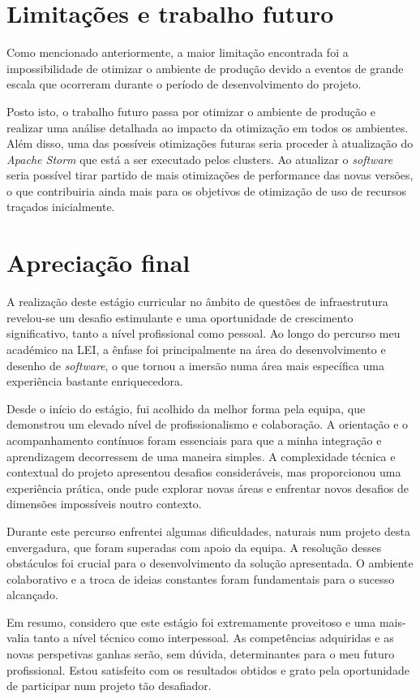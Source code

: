 \section{Limitações e trabalho futuro}

Como mencionado anteriormente, a maior limitação encontrada foi a impossibilidade de otimizar o
ambiente de produção devido a eventos de grande escala que ocorreram durante o período de
desenvolvimento do projeto. 

Posto isto, o trabalho futuro passa por otimizar o ambiente de produção e realizar uma análise 
detalhada ao impacto da otimização em todos os ambientes. Além disso, uma das possíveis otimizações 
futuras seria proceder à atualização do \textit{Apache Storm} que está a ser executado pelos 
\glspl{cluster}. Ao atualizar o \textit{software} seria possível tirar partido de mais otimizações 
de performance das novas versões, o que contribuiria ainda mais para os objetivos de otimização
de uso de recursos traçados inicialmente.

\section{Apreciação final}

A realização deste estágio curricular no âmbito de questões de infraestrutura revelou-se um desafio 
estimulante e uma oportunidade de crescimento significativo, tanto a nível profissional como 
pessoal. Ao longo do percurso meu académico na \ac{LEI}, a ênfase foi principalmente na área do 
desenvolvimento e desenho de \textit{software}, o que tornou a imersão numa área mais específica 
uma experiência bastante enriquecedora.

Desde o início do estágio, fui acolhido da melhor forma pela equipa, que demonstrou um elevado 
nível de profissionalismo e colaboração. A orientação e o acompanhamento contínuos foram essenciais
para que a minha integração e aprendizagem decorressem de uma maneira simples. A complexidade
técnica e contextual do projeto apresentou desafios consideráveis, mas proporcionou uma 
experiência prática, onde pude explorar novas áreas e enfrentar novos desafios de dimensões 
impossíveis noutro contexto.

Durante este percurso enfrentei algumas dificuldades, naturais num projeto desta envergadura, que 
foram superadas com apoio da equipa. A resolução desses obstáculos foi crucial para o desenvolvimento
da solução apresentada. O ambiente colaborativo e a troca de ideias constantes foram fundamentais 
para o sucesso alcançado.

Em resumo, considero que este estágio foi extremamente proveitoso e uma mais-valia tanto a nível
técnico como interpessoal. As competências adquiridas e as novas perspetivas ganhas serão, sem 
dúvida, determinantes para o meu futuro profissional. Estou satisfeito com os resultados obtidos e
grato pela oportunidade de participar num projeto tão desafiador.

